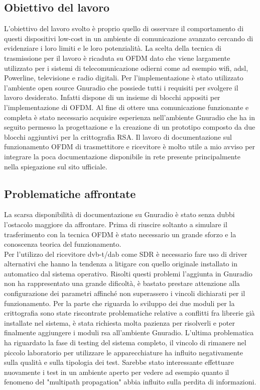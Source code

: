 \subsection{Obiettivo del lavoro} L'obiettivo del lavoro svolto è proprio quello di osservare il comportamento di questi dispositivi low-cost in un ambiente di comunicazione avanzato cercando di evidenziare i loro limiti e le loro potenzialità.
La scelta della tecnica di trasmissione per il lavoro è ricaduta su OFDM dato che viene largamente utilizzato per i sistemi di telecomunicazione odierni come ad esempio wifi, adsl, Powerline, televisione e radio digitali.
Per l'implementazione è stato utilizzato l'ambiente open source Gnuradio che possiede tutti i requisiti per svolgere il lavoro desiderato. Infatti dispone di un insieme di blocchi appositi per l'implementazione di OFDM.
Al fine di ottere una comunicazione funzionante e completa è stato necessario acquisire esperienza nell'ambiente Gnuradio che ha in seguito permesso la progettazione e la creazione di un prototipo composto da due blocchi aggiuntivi per la crittografia RSA.
Il lavoro di documentazione sul funzionamento OFDM di trasmettitore e ricevitore è molto utile a mio avviso per integrare la poca documentazione disponibile in rete presente principalmente nella spiegazione sul sito ufficiale.
\subsection{Problematiche affrontate}
La scarsa disponibilità di documentazione su Gnuradio è stato senza dubbi l'ostacolo maggiore da affrontare. Prima di riuscire soltanto a simulare il trasferimento con la tecnica OFDM è stato necessario un grande sforzo e la conoscenza teorica del funzionamento.\\ Per l'utilizzo del ricevitore dvb-t/dab come SDR è necessario fare uso di driver alternativi che hanno la tendenza a litigare con quello originale installato in automatico dal sistema operativo. Risolti questi problemi l'aggiunta in Gnuradio non ha rappresentato una grande dificoltà, è bastato prestare attenzione alla configurazione dei parametri affinché non superassero i vincoli dichiarati per il funzionamento.
Per la parte che riguarda lo sviluppo dei due moduli per la crittografia sono state riscontrate problematiche relative a conflitti fra librerie già installate nel sistema, è stata richiesta molta pazienza per risolverli e poter finalmente aggiungere i moduli rsa all'ambiente Gnuradio.
L'ultima problematica ha riguardato la fase di testing del sistema completo, il vincolo di rimanere nel piccolo laboratorio per utilizzare le apparecchiature ha influito negativamente sulla qualità e sulla tipologia dei test. Sarebbe stato interessante effettuare nuovamente i test in un ambiente aperto per vedere ad esempio quanto il fenomeno del "multipath propagation" abbia influito sulla perdita di informazioni.
